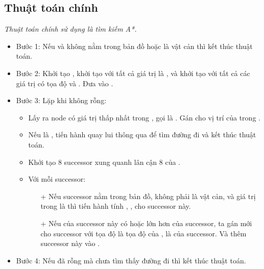 \subsection{Thuật toán chính}
\textit{Thuật toán chính sử dụng là tìm kiếm A*.}
\begin{itemize}
	\item Bước 1: Nếu  và  không nằm trong bản đồ hoặc là vật cản thì kết thúc thuật toán.
	\item Bước 2: Khởi tạo , khởi tạo  với tất cả giá trị là , và khởi tạo  với tất cả các giá trị có tọa độ  và . Đưa  vào .
	\item Bước 3: Lặp khi  không rỗng:
	\begin{itemize}
		\item Lấy ra node có giá trị  thấp nhất trong , gọi là . Gán  cho vị trí của  trong .
		\item Nếu  là , tiến hành quay lui thông qua  để tìm đường đi và kết thúc thuật toán.
		\item Khởi tạo 8 successor xung quanh lân cận 8 của .
		\item Với mỗi successor:
		\begin{itemize}
			\item[+] Nếu successor nằm trong bản đồ, không phải là vật cản, và giá trị trong  là  thì tiến hành tính , ,  cho successor này.
			\item[+] Nếu  của successor này có  hoặc \code{f} lớn hơn  của successor, ta gán  mới cho successor với tọa độ là tọa độ của , \code{f} là  của successor. Và thêm successor này vào .
		\end{itemize}
	\end{itemize}
	
	\item Bước 4: Nếu  đã rỗng mà chưa tìm thấy đường đi thì kết thúc thuật toán.
	
\end{itemize}
\newpage